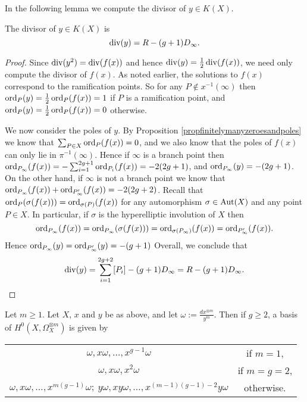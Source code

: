 In the following lemma we compute the divisor of $y \in K(X)$.
    \begin{lem}\label{lemmadivisorofycharacteristicnot2}
    The divisor of $y \in K(X)$ is 
        \begin{equation}\label{equationdivisorofypnot2}
        \operatorname{div}(y)  = R - (g+1)D_\infty.
        \end{equation}
    \end{lem}
    \begin{proof}
    Since $\operatorname{div} (y^2) = \operatorname{div} (f(x))$ and hence $\operatorname{div}(y) = \frac{1}{2}\operatorname{div}(f(x))$, we need only compute the divisor of $f(x)$.
    As noted earlier, the solutions to $f(x)$ correspond to the ramification points.
    So for any $P\notin x^{-1}(\infty)$ then $\operatorname{ord}_P(y) =  \frac{1}{2}\operatorname{ord}_P(f(x)) = 1$ if $P$ is a ramification point, and $\operatorname{ord}_P(y) = \frac{1}{2}\operatorname{ord}_P(f(x)) = 0$ otherwise.

    We now consider the poles of $y$.
    By Proposition \ref{propfinitelymanyzeroesandpoles} we know that $\sum_{P \in X} \operatorname{ord}_P(f(x)) = 0$, and we also know that the poles of $f(x)$ can only lie in $\pi^{-1}(\infty)$.
    Hence if $\infty$ is a branch point then $\operatorname{ord}_{P_\infty}(f(x)) = -\sum_{i=1}^{2g+1}\operatorname{ord}_{P_i}(f(x)) = -2(2g+1)$, and $\operatorname{ord}_{P_\infty}(y) = -(2g+1)$.
    On the other hand, if $\infty$ is not a branch point we know that $\operatorname{ord}_{P_\infty}(f(x)) + \operatorname{ord}_{P_\infty'}(f(x)) = -2(2g+2)$.
    Recall that $\operatorname{ord}_{P}(\sigma(f(x))) = \operatorname{ord}_{\sigma(P)}(f(x))$ for any automorphism $\sigma \in \operatorname{Aut}(X)$ and any point $P \in X$.
    In particular, if $\sigma$ is the hyperelliptic involution of $X$ then 
        \[
        \operatorname{ord}_{P_\infty}(f(x)) = \operatorname{ord}_{P_\infty}(\sigma(f(x))) = \operatorname{ord}_{\sigma(P_\infty)}(f(x)) = \operatorname{ord}_{P_\infty'}(f(x)).
        \]
    Hence $\operatorname{ord}_{P_\infty}(y) = \operatorname{ord}_{P_\infty'}(y) = -(g+1)$
    Overall, we conclude that
        \[
        \operatorname{div}(y) = \sum_{i=1}^{2g+2} [P_i]- (g+1)D_\infty = R - (g+1)D_{\infty}.
        \]
    \end{proof}


    \begin{prop}\label{prophyperellipticbasispnot2}
    Let $m\geq 1$.
    Let $X$, $x$ and $y$ be as above, and let $\omega := \frac{dx^{\otimes m}}{y^m}$. 
    Then if $g\geq 2$, a basis of $H^0(X,\Omega_X^{\otimes m})$ is given by\par
        {\centering 
        \begin{tabular}{c c}
        $\omega, x\omega, \ldots , x^{g-1}\omega$ &  if $m=1$, \\
        $\omega, x\omega, x^2\omega$  &  if $m=g=2$, \\
        $\omega, x\omega, \ldots, x^{m(g-1)}\omega;\  y\omega, xy\omega, \ldots, x^{(m-1)(g-1)-2}y\omega$ &  otherwise.
        \end{tabular}\par
        }
    \end{prop}

